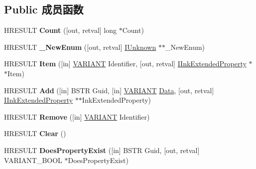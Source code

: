 \subsection*{Public 成员函数}
\begin{DoxyCompactItemize}
\item 
\mbox{\label{interface_m_s_i_n_k_a_u_t_lib_1_1_i_ink_extended_properties_adb862845af3939e96686f4f8e84e18ea}} 
H\+R\+E\+S\+U\+LT {\bfseries Count} (\mbox{[}out, retval\mbox{]} long $\ast$Count)
\item 
\mbox{\label{interface_m_s_i_n_k_a_u_t_lib_1_1_i_ink_extended_properties_aff11f3a6814004483f08b12c8a4d4932}} 
H\+R\+E\+S\+U\+LT {\bfseries \+\_\+\+New\+Enum} (\mbox{[}out, retval\mbox{]} \hyperlink{interface_i_unknown}{I\+Unknown} $\ast$$\ast$\+\_\+\+New\+Enum)
\item 
\mbox{\label{interface_m_s_i_n_k_a_u_t_lib_1_1_i_ink_extended_properties_a14dac071d03aaf8c53de36e02e918332}} 
H\+R\+E\+S\+U\+LT {\bfseries Item} (\mbox{[}in\mbox{]} \hyperlink{structtag_v_a_r_i_a_n_t}{V\+A\+R\+I\+A\+NT} Identifier, \mbox{[}out, retval\mbox{]} \hyperlink{interface_m_s_i_n_k_a_u_t_lib_1_1_i_ink_extended_property}{I\+Ink\+Extended\+Property} $\ast$$\ast$Item)
\item 
\mbox{\label{interface_m_s_i_n_k_a_u_t_lib_1_1_i_ink_extended_properties_ab41c1f206032f91eedd7a62138c5f1dc}} 
H\+R\+E\+S\+U\+LT {\bfseries Add} (\mbox{[}in\mbox{]} B\+S\+TR Guid, \mbox{[}in\mbox{]} \hyperlink{structtag_v_a_r_i_a_n_t}{V\+A\+R\+I\+A\+NT} \hyperlink{struct_data}{Data}, \mbox{[}out, retval\mbox{]} \hyperlink{interface_m_s_i_n_k_a_u_t_lib_1_1_i_ink_extended_property}{I\+Ink\+Extended\+Property} $\ast$$\ast$Ink\+Extended\+Property)
\item 
\mbox{\label{interface_m_s_i_n_k_a_u_t_lib_1_1_i_ink_extended_properties_aed6327f22e415a82182812e78fa3b5c7}} 
H\+R\+E\+S\+U\+LT {\bfseries Remove} (\mbox{[}in\mbox{]} \hyperlink{structtag_v_a_r_i_a_n_t}{V\+A\+R\+I\+A\+NT} Identifier)
\item 
\mbox{\label{interface_m_s_i_n_k_a_u_t_lib_1_1_i_ink_extended_properties_acc8f1045f45fab7d2dc036dc8a3e1273}} 
H\+R\+E\+S\+U\+LT {\bfseries Clear} ()
\item 
\mbox{\label{interface_m_s_i_n_k_a_u_t_lib_1_1_i_ink_extended_properties_ab1d923e57f29999adcedbd828c30d67c}} 
H\+R\+E\+S\+U\+LT {\bfseries Does\+Property\+Exist} (\mbox{[}in\mbox{]} B\+S\+TR Guid, \mbox{[}out, retval\mbox{]} V\+A\+R\+I\+A\+N\+T\+\_\+\+B\+O\+OL $\ast$Does\+Property\+Exist)
\end{DoxyCompactItemize}
